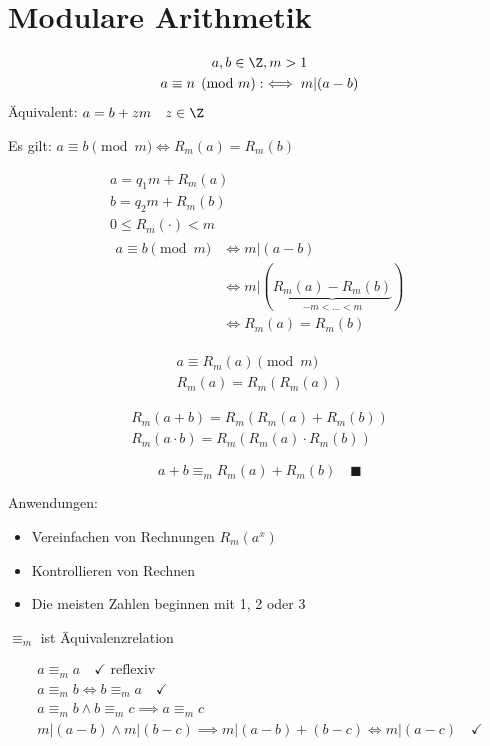 \section{Modulare Arithmetik}
\begin{def*}[note = kongruent , index = kongruent]
	\begin{gather*}
		a, b \in \Z , m > 1 \\
		a \equiv n \pmod m :\iff  m | (a-b)
	\end{gather*}
	Äquivalent: $a = b + zm \quad z \in \Z$\\
\end{def*}
Es gilt: $a \equiv b \pmod m \iff R_m(a) = R_m(b)$ \\
\begin{bew}
	\begin{gather*}
		a = q_1 m + R_m(a) \\
		b = q_2 m + R_m(b) \\
		0 \leq R_m(\cdot) < m \\
		\begin{split}
			a \equiv b \pmod m	&\iff m | (a-b) \\
							&\iff m | (\underbrace{R_m(a) - R_m(b)}_{-m< \dots <m}) \\
							&\iff R_m(a) = R_m(b)
		\end{split}
	\end{gather*}
\end{bew}
\begin{gather*}
	a \equiv R_m(a) \pmod m \\
	R_m(a) = R_m(R_m(a))
\end{gather*}
\begin{satz*}
	\begin{gather*}
		R_m(a + b) = R_m(R_m(a) + R_m(b)) \\
		R_m(a \cdot b) = R_m(R_m(a) \cdot R_m(b))
	\end{gather*}
	\begin{bew}
		\[ a + b \equiv_m R_m(a) + R_m(b) \quad \blacksquare \]
	\end{bew}
\end{satz*}
Anwendungen:
\begin{itemize}
	\item Vereinfachen von Rechnungen $R_m(a^x)$
	\item Kontrollieren von Rechnen
	\item Die meisten Zahlen beginnen mit 1, 2 oder 3
\end{itemize}

$\equiv_m$ ist Äquivalenzrelation\\
\begin{bew}
	\begin{gather*}
		a \equiv_m a \quad \checkmark \text{ reflexiv} \\
		a \equiv_m b \iff b \equiv_m a\quad \checkmark \\
		a \equiv_m b \wedge b \equiv_m c \implies a \equiv_m c \\
		m | (a-b) \wedge m | (b-c) \implies m | (a-b) + (b-c) \iff m | (a-c)\quad \checkmark
	\end{gather*}
\end{bew}

